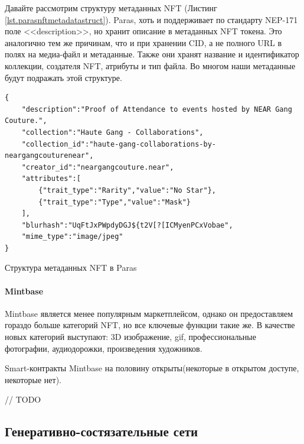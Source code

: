 Давайте рассмотрим структуру метаданных NFT (Листинг {\color{blue}\ref{lst.parasnftmetadatastruct}}). Paras, хоть и поддерживает по стандарту NEP-171 поле <<description>>, но хранит описание в метаданных NFT токена. Это аналогично тем же причинам, что и при хранении CID, а не полного URL в полях на медиа-файл и метаданные. Также они хранят название и идентификатор коллекции, создателя NFT, атрибуты и тип файла. Во многом наши метаданные будут подражать этой структуре.

\begin{listing}[H]
\begin{verbatim}
{
    "description":"Proof of Attendance to events hosted by NEAR Gang Couture.",
    "collection":"Haute Gang - Collaborations",
    "collection_id":"haute-gang-collaborations-by-neargangcouturenear",
    "creator_id":"neargangcouture.near",
    "attributes":[
        {"trait_type":"Rarity","value":"No Star"},
        {"trait_type":"Type","value":"Mask"}
    ],
    "blurhash":"UqFtJxPWpdyDGJ${t2V[?[ICMyenPCxVobae",
    "mime_type":"image/jpeg"
}
\end{verbatim}
\caption{Структура метаданных NFT в Paras}
\label{lst.parasnftmetadatastruct}
\end{listing}


\paragraph{Mintbase}

Mintbase является менее популярным маркетплейсом, однако он предоставляем гораздо больше категорий NFT, но все ключевые функции такие же. В качестве новых категорий выступают: 3D изображение, gif, профессиональные фотографии, аудиодорожки, произведения художников.

Smart-контракты Mintbase на половину открыты(некоторые в открытом доступе, некоторые нет)\cite{mintbasecontracts}.

// TODO

\subsection{Генеративно-состязательные сети}
